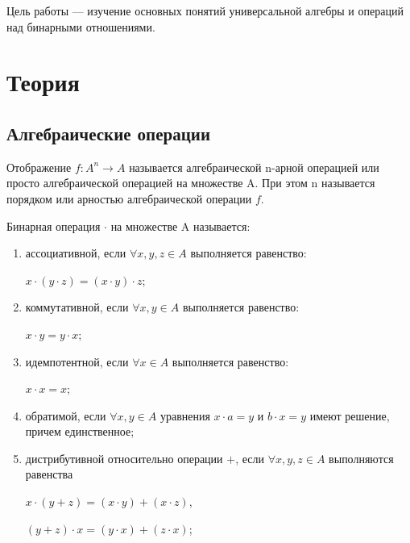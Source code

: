 \documentclass[bachelor, och, labwork]{shiza}
\begin{document}
	
	
	\tableofcontents
	
	\newpage
	
	Цель работы — изучение основных понятий универсальной алгебры и операций над бинарными отношениями. 
	
	\section{Теория}
	    \subsection{Алгебраические операции}

	Отображение $f : A^n \rightarrow A$ называется алгебраической n-арной операцией или просто 
	алгебраической операцией на множестве A. При этом n называется порядком или арностью алгебраической операции $f$.
	
	 Бинарная операция $\cdot$ на множестве A называется:
	
	\begin{enumerate}
		\item ассоциативной, если $\forall x, y, z \in A$ выполняется равенство:	

			$x \cdot (y \cdot z) = (x \cdot y) \cdot z$;
		
		\item коммутативной, если $\forall x, y \in A$ выполняется равенство:		

			$x \cdot y = y \cdot x$;
		
		\item идемпотентной, если $\forall x \in A$ выполняется равенство:
		
			$x \cdot x = x$;

		\item обратимой, если $\forall x, y \in A$ уравнения $x \cdot a = y$ и $b \cdot x = y$  имеют решение, причем единственное;
		
		\item дистрибутивной относительно операции $+$, если $\forall x, y, z \in A$ выполняются равенства
		
			$x \cdot (y + z) = (x \cdot y) + (x \cdot z)$,
			
			$(y + z) \cdot x = (y \cdot x) + (z \cdot x)$;

	\end{enumerate}
\end{document}
